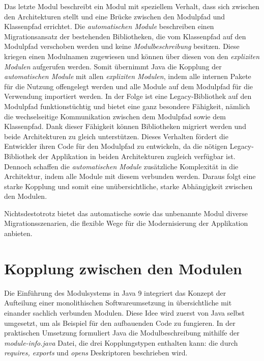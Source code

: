     Das letzte Modul beschreibt ein Modul mit speziellem Verhalt, dass sich zwischen den Architekturen stellt und eine Brücke zwischen den Modulpfad und Klassenpfad errichtet. Die \textit{automatischen Module} beschreiben einen Migrationsansatz der bestehenden Bibliotheken, die vom Klassenpfad auf den Modulpfad verschoben werden und keine \textit{Modulbeschreibung} besitzen. Diese kriegen einen Modulnamen zugewiesen und können über diesen von den \textit{expliziten Modulen} aufgerufen werden. Somit übernimmt Java die Kopplung der \textit{automatischen Module} mit allen \textit{expliziten Modulen}, indem alle internen Pakete für die Nutzung offengelegt werden und alle Module auf dem Modulpfad für die Verwendung importiert werden. In der Folge ist eine Legacy-Bibliothek auf den Modulpfad funktionstüchtig und bietet eine ganz besondere Fähigkeit, nämlich die wechselseitige Kommunikation zwischen dem Modulpfad sowie dem Klassenpfad. Dank dieser Fähigkeit können Bibliotheken migriert werden und beide Architekturen zu gleich unterstützen. Dieses Verhalten fördert die Entwickler ihren Code für den Modulpfad zu entwickeln, da die nötigen Legacy-Bibliothek der Applikation in beiden Architekturen zugleich verfügbar ist.\newline 
    Dennoch schaffen die \textit{automatischen Module} zusätzliche Komplexität in die Architektur, indem alle Module mit diesem verbunden werden. Daraus folgt eine starke Kopplung und somit eine unübersichtliche, starke Abhängigkeit zwischen den Modulen.\cite{modulMitJava9,java9modRevealed,modulProgJava9}\bigbreak

    Nichtsdestotrotz bietet das automatische sowie das unbenannte Modul diverse Migrationsszenarien, die flexible Wege für die Modernisierung der Applikation anbieten. 

  \section{Kopplung zwischen den Modulen} \label{sec:mod_kop}
    Die Einführung des Modulsystems in Java 9 integriert das Konzept der Aufteilung einer monolithischen Softwareumsetzung in übersichtliche mit einander sachlich verbunden Modulen. Diese Idee wird zuerst von Java selbst umgesetzt, um als Beispiel für den aufbauenden Code zu fungieren. In der praktischen Umsetzung formuliert Java die Modulbeschreibung mithilfe der \textit{module-info.java} Datei, die drei Kopplungstypen enthalten kann: die durch \textit{requires, exports} und \textit{opens} Deskriptoren beschrieben wird.

